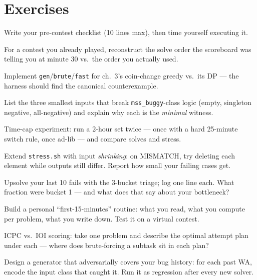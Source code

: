 \section*{Exercises}
\begin{exercise}[easy] Write your pre-contest checklist (10 lines max), then time yourself executing it. \end{exercise}
\begin{exercise}[easy] For a contest you already played, reconstruct the solve order the scoreboard was telling you at minute 30 vs.\ the order you actually used. \end{exercise}
\begin{exercise}[easy] Implement \texttt{gen}/\texttt{brute}/\texttt{fast} for ch.~3's coin-change greedy vs.\ its DP --- the harness should find the canonical counterexample. \end{exercise}
\begin{exercise}[easy] List the three smallest inputs that break \texttt{mss\_buggy}-class logic (empty, singleton negative, all-negative) and explain why each is the \emph{minimal} witness. \end{exercise}
\begin{exercise}[medium] Time-cap experiment: run a 2-hour set twice --- once with a hard 25-minute switch rule, once ad-lib --- and compare solves and stress. \end{exercise}
\begin{exercise}[medium] Extend \texttt{stress.sh} with input \emph{shrinking}: on MISMATCH, try deleting each element while outputs still differ. Report how small your failing cases get. \end{exercise}
\begin{exercise}[medium] Upsolve your last 10 fails with the 3-bucket triage; log one line each. What fraction were bucket 1 --- and what does that say about your bottleneck? \end{exercise}
\begin{exercise}[medium] Build a personal ``first-15-minutes'' routine: what you read, what you compute per problem, what you write down. Test it on a virtual contest. \end{exercise}
\begin{exercise}[medium] ICPC vs.\ IOI scoring: take one problem and describe the optimal attempt plan under each --- where does brute-forcing a subtask sit in each plan? \end{exercise}
\begin{exercise}[medium] Design a generator that adversarially covers your bug history: for each past WA, encode the input class that caught it. Run it as regression after every new solver. \end{exercise}
